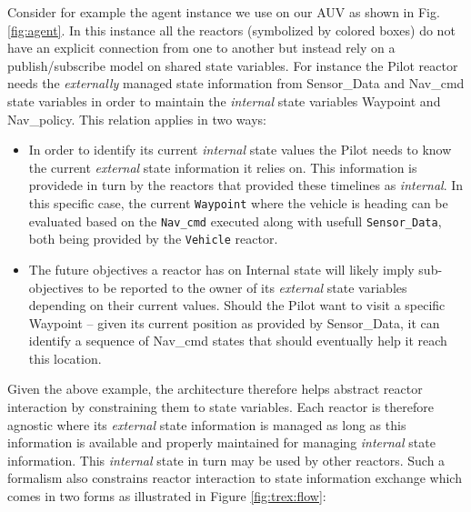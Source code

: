 Consider for example the \rx agent instance we use on our AUV as shown
in Fig. \ref{fig:agent}. In this instance all the reactors (symbolized
by colored boxes) do not have an explicit connection from one to
another but instead rely on a publish/subscribe model on shared state
variables. For instance the \textsf{Pilot} reactor needs the {\em
  externally} managed state information from \textsf{Sensor\_Data} and
\textsf{Nav\_cmd} state variables in order to maintain the
\emph{internal} state variables \textsf{Waypoint} and
\textsf{Nav\_policy}. This relation applies in two ways:

\begin{itemize}

\item In order to identify its current {\em internal} state values the
  \textsf{Pilot} needs to know the current {\em external} state 
  information it relies on. This information is providede in turn by
  the reactors that provided these timelines as {\em internal}. In
  this specific case, the current \texttt{Waypoint} where the vehicle
  is heading can be evaluated based on the \texttt{Nav\_cmd} executed
  along with usefull \texttt{Sensor\_Data}, both being provided by the
  \texttt{Vehicle} reactor.

\item The future objectives a reactor has on \textsf{Internal} state
  will likely imply sub-objectives to be reported to the owner of its
  {\em external} state variables depending on their current
  values. Should the \textsf{Pilot} want to visit a specific
  \textsf{Waypoint} -- given its current position as provided by
  \textsf{Sensor\_Data}, it can identify a sequence of
  \textsf{Nav\_cmd} states that should eventually help it reach this
  location. %

\end{itemize}

Given the above example, the \rx architecture therefore helps abstract
reactor interaction by constraining them to state variables. Each
reactor is therefore agnostic where its {\em external} state
information is managed as long as this information is available and
properly maintained for managing {\em internal} state
information. This {\em internal} state in turn may be used by other
reactors. Such a formalism also constrains reactor interaction to
state information exchange which comes in two forms as illustrated in
Figure \ref{fig:trex:flow}:

